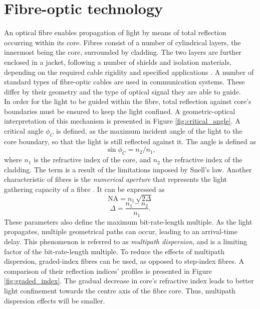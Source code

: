 \documentclass{standalone}
\begin{document}
\chapter{Fibre-optic technology} \label{ch:fibres}
\setcounter{page}\thestranica


An optical fibre enables propagation of light by means of total reflection occurring within its core. Fibres consist of a number of cylindrical layers, the innermost being the core, surrounded by cladding. The two layers are further enclosed in a jacket, following a number of shields and isolation materials, depending on the required cable rigidity and specified applications \cite{fer:oks}. A number of standard types of fibre-optic cables are used in communication systems. These differ by their geometry and the type of optical signal they are able to guide. \\

In order for the light to be guided within the fibre, total reflection against core's boundaries must be ensured to keep the light confined. A geometric-optical interpretation of this mechanism is presented in Figure \ref{fig:critical_angle}.
A critical angle $\phi_C$ is defined, as the maximum incident angle of the light to the core boundary, so that the light is still reflected against it. The angle is defined as
\begin{equation}
\sin \phi_C = n_2/n_1 \textrm{,}
\end{equation}
where $n_1$ is the refractive index of the core, and $n_2$ the refractive index of the cladding. The term is a result of the limitations imposed by Snell's law. Another characteristic of fibres is the \textit{numerical aperture} that represents the light gathering capacity of a fibre \cite{agrawal2005lightwave}. It can be expressed as 
\begin{equation}
\textrm{NA} = n_1 \, \sqrt{2 \varDelta}
\end{equation}
\begin{equation}
\varDelta = \frac{n_1 - n_2}{n_1} \textrm{.}
\end{equation}
These parameters also define the maximum bit-rate-length multiple. As the light propagates, multiple geometrical paths can occur, leading to an arrival-time delay. This phenomenon is referred to as \textit{multipath dispersion}, and is a limiting factor of the bit-rate-length multiple. To reduce the effects of multipath dispersion, graded-index fibres can be used, as opposed to step-index fibres. A comparison of their reflection indices' profiles is presented in Figure \ref{fig:graded_index}.
The gradual decrease in core's refractive index leads to better light confinement towards the centre axis of the fibre core. Thus, multipath dispersion effects will be smaller.\\
\end{document}
